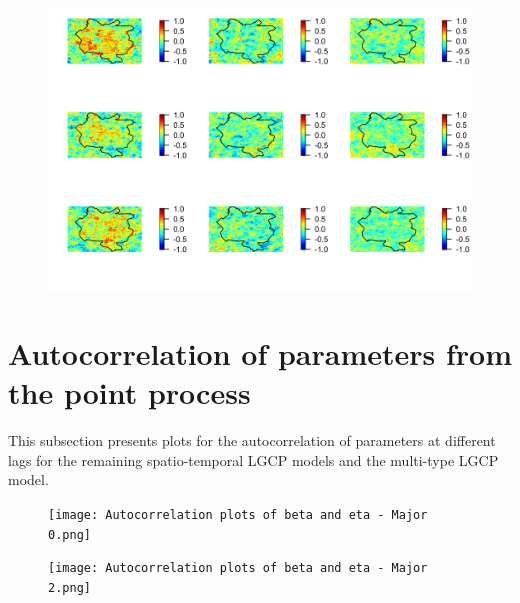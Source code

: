 \begin{appendices}
    \begin{figure}[h]
        \begin{center}
            \includegraphics{Autocorrelation in the latent field - Multi-type.png}
        \end{center}
    \end{figure}

    \newpage
    
\section{Autocorrelation of parameters from the point process} \label{app:point-process}

    This subsection presents plots for the autocorrelation of parameters at different lags for the remaining spatio-temporal LGCP models and the multi-type LGCP model.

    \begin{figure}[h]
        \begin{center}
            \texttt{[image: Autocorrelation plots of beta and eta - Major 0.png]}
        \end{center}
    \end{figure}

    \begin{figure}[H]
        \begin{center}
            \texttt{[image: Autocorrelation plots of beta and eta - Major 2.png]}
        \end{center}
    \end{figure}


\end{appendices}
